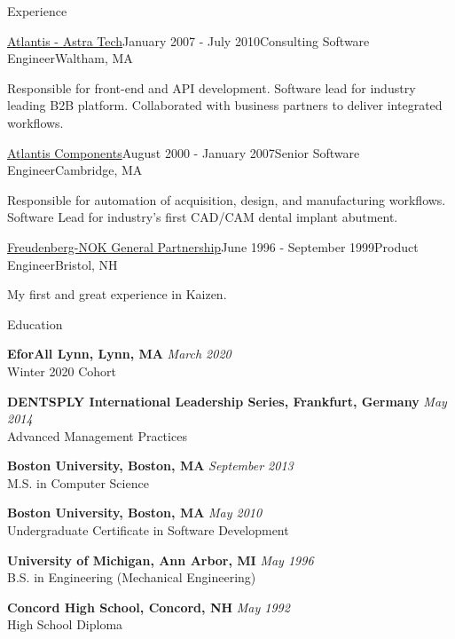 \documentclass{resume}
\begin{document}
\begin{rSection}{Experience}
\begin{rSubsection}{\href{https://dentsplysirona.com}{Atlantis - Astra Tech}}{January 2007 - July 2010}{Consulting Software Engineer}{Waltham, MA}
\item Responsible for front-end and API development. Software lead for industry leading B2B platform. Collaborated with business partners to deliver integrated workflows.
\end{rSubsection}

\begin{rSubsection}{\href{https://dentsplysirona.com}{Atlantis Components}}{August 2000 - January 2007}{Senior Software Engineer}{Cambridge, MA}
\item Responsible for automation of acquisition, design, and manufacturing workflows. Software Lead for industry's first CAD/CAM dental implant abutment.
\end{rSubsection}

\pagebreak

\begin{rSubsection}{\href{https://fst.com}{Freudenberg-NOK General Partnership}}{June 1996 - September 1999}{Product Engineer}{Bristol, NH}
\item My first and great experience in Kaizen.
\end{rSubsection}

\end{rSection}

\begin{rSection}{Education}

\item {\bf EforAll Lynn, Lynn, MA} \hfill {\em March 2020} \\
Winter 2020 Cohort

\item {\bf DENTSPLY International Leadership Series, Frankfurt, Germany} \hfill {\em May 2014} \\
Advanced Management Practices

\item {\bf Boston University, Boston, MA} \hfill {\em September 2013} \\
M.S. in Computer Science

\item {\bf Boston University, Boston, MA} \hfill {\em May 2010} \\
Undergraduate Certificate in Software Development

\item {\bf University of Michigan, Ann Arbor, MI} \hfill {\em May 1996} \\
B.S. in Engineering (Mechanical Engineering)

\item {\bf Concord High School, Concord, NH} \hfill {\em May 1992} \\
High School Diploma

\end{rSection}
\end{document}
